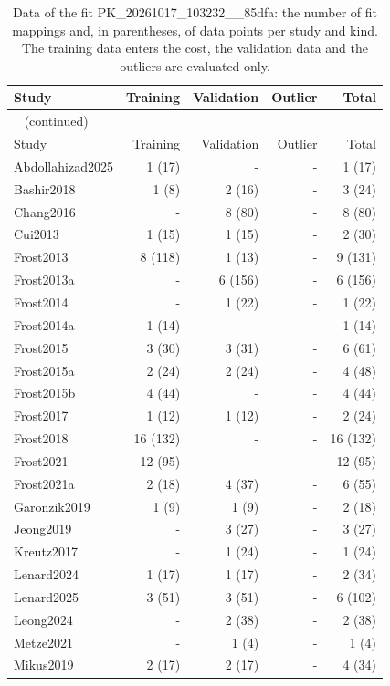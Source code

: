 \begin{longtable}{lrrrr}
\caption{Data of the fit PK\_20261017\_103232\_\_85dfa: the number of fit mappings and, in parentheses, of data points per study and kind. The training data enters the cost, the validation data and the outliers are evaluated only.}\label{tab:data:PK_20261017_103232__85dfa} \\
\toprule
Study & Training & Validation & Outlier & Total \\
\midrule
\endfirsthead
\multicolumn{5}{l}{\small\tablename~\thetable{} (continued)} \\
\toprule
Study & Training & Validation & Outlier & Total \\
\midrule
\endhead
\bottomrule
\endlastfoot
Abdollahizad2025 & 1 (17) & - & - & 1 (17) \\
Bashir2018 & 1 (8) & 2 (16) & - & 3 (24) \\
Chang2016 & - & 8 (80) & - & 8 (80) \\
Cui2013 & 1 (15) & 1 (15) & - & 2 (30) \\
Frost2013 & 8 (118) & 1 (13) & - & 9 (131) \\
Frost2013a & - & 6 (156) & - & 6 (156) \\
Frost2014 & - & 1 (22) & - & 1 (22) \\
Frost2014a & 1 (14) & - & - & 1 (14) \\
Frost2015 & 3 (30) & 3 (31) & - & 6 (61) \\
Frost2015a & 2 (24) & 2 (24) & - & 4 (48) \\
Frost2015b & 4 (44) & - & - & 4 (44) \\
Frost2017 & 1 (12) & 1 (12) & - & 2 (24) \\
Frost2018 & 16 (132) & - & - & 16 (132) \\
Frost2021 & 12 (95) & - & - & 12 (95) \\
Frost2021a & 2 (18) & 4 (37) & - & 6 (55) \\
Garonzik2019 & 1 (9) & 1 (9) & - & 2 (18) \\
Jeong2019 & - & 3 (27) & - & 3 (27) \\
Kreutz2017 & - & 1 (24) & - & 1 (24) \\
Lenard2024 & 1 (17) & 1 (17) & - & 2 (34) \\
Lenard2025 & 3 (51) & 3 (51) & - & 6 (102) \\
Leong2024 & - & 2 (38) & - & 2 (38) \\
Metze2021 & - & 1 (4) & - & 1 (4) \\
Mikus2019 & 2 (17) & 2 (17) & - & 4 (34) \\

\end{longtable}
